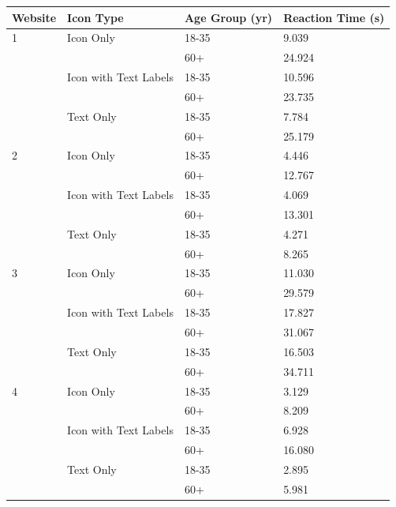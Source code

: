 \documentclass[12pt,twoside]{reedthesis}
\begin{document}
\begin{table}[h!]
    \centering
    \begin{tabular}{| p{2cm} | p{5cm} | p{3cm} | p{3.5cm}|}
        \hline
        Website & Icon Type & Age Group (yr) & Reaction Time (s)\\
        \hline
        1 & Icon Only & 18-35 & 9.039\\
        \hline
        & & 60+ & 24.924\\
        \hline
        & Icon with Text Labels & 18-35 & 10.596\\
        \hline
        && 60+ &23.735\\
        \hline
        & Text Only & 18-35 & 7.784\\
        \hline
         && 60+ & 25.179\\
        \hline

        2 & Icon Only & 18-35 & 4.446\\
        \hline
        & & 60+ & 12.767\\
        \hline
        & Icon with Text Labels & 18-35 & 4.069\\
        \hline
        && 60+ & 13.301\\
        \hline
        & Text Only & 18-35 & 4.271\\
        \hline
         && 60+ & 8.265\\
        \hline

        3 & Icon Only & 18-35 & 11.030\\
        \hline
        & & 60+ & 29.579\\
        \hline
        & Icon with Text Labels & 18-35 & 17.827\\
        \hline
        && 60+ & 31.067\\
        \hline
        & Text Only & 18-35 & 16.503\\
        \hline
         && 60+ & 34.711\\
        \hline

        4 & Icon Only & 18-35 & 3.129\\
        \hline
        & & 60+ & 8.209\\
        \hline
        & Icon with Text Labels & 18-35 & 6.928\\
        \hline
        && 60+ & 16.080\\
        \hline
        & Text Only & 18-35 & 2.895\\
        \hline
         && 60+ & 5.981\\
        \hline


\end{tabular}
\end{table}
\end{document}
